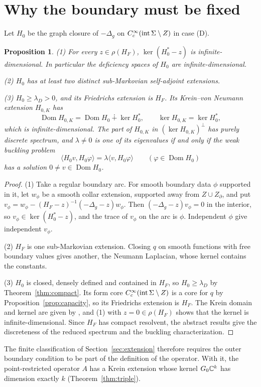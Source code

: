 \documentclass[11pt]{article}
\newtheorem{proposition}[theorem]{Proposition}
\theoremstyle{definition}\newtheorem{definition}[theorem]{Definition}
\theoremstyle{remark}\newtheorem{remark}[theorem]{Remark}
\newcommand{\Dom}{\operatorname{Dom}}\newcommand{\dd}{\,d}
\begin{document}
\section{Why the boundary must be fixed}\label{sec:boundary}
Let $H_0$ be the graph closure of $-\Delta_g$ on $C_c^\infty(\operatorname{int}\Sigma\setminus Z)$
in case (D).
\begin{proposition}\label{prop:outer}
(1) For every $z\in\rho(H_F)$, $\ker(H_0^*-z)$ is infinite-dimensional. In
particular the deficiency spaces of $H_0$ are infinite-dimensional.

(2) $H_0$ has at least two distinct sub-Markovian self-adjoint extensions.

(3) $H_0\geq\lambda_D>0$, and its Friedrichs extension is $H_F$. Its
Krein--von Neumann extension $H_{0,K}$ has
\[
 \Dom H_{0,K}=\Dom H_0\dotplus\ker H_0^*,\qquad \ker H_{0,K}=\ker H_0^*,
\]
which is infinite-dimensional. The part of $H_{0,K}$ in $(\ker H_{0,K})^\perp$ has
purely discrete spectrum, and $\lambda\neq0$ is one of its eigenvalues if and only
if the weak buckling problem
\[
 \langle H_0v,H_0\varphi\rangle=\lambda\langle v,H_0\varphi\rangle\qquad(\varphi\in\Dom H_0)
\]
has a solution $0\neq v\in\Dom H_0$.
\end{proposition}
\begin{proof}
(1) Take a regular boundary arc. For smooth boundary data $\phi$ supported in
it, let $w_\phi$ be a smooth collar extension, supported away from $Z\cup Z_\partial$,
and put $v_\phi=w_\phi-(H_F-z)^{-1}(-\Delta_g-z)w_\phi$. Then
$(-\Delta_g-z)v_\phi=0$ in the interior, so $v_\phi\in\ker(H_0^*-z)$, and the trace
of $v_\phi$ on the arc is $\phi$. Independent $\phi$ give independent $v_\phi$.

(2) $H_F$ is one sub-Markovian extension. Closing $q$ on smooth functions with
free boundary values gives another, the Neumann Laplacian, whose kernel
contains the constants.

(3) $H_0$ is closed, densely defined and contained in $H_F$, so
$H_0\geq\lambda_D$ by Theorem~\ref{thm:compact}. Its form core
$C_c^\infty(\operatorname{int}\Sigma\setminus Z)$ is a core for $q$ by
Proposition~\ref{prop:capacity}, so its Friedrichs extension is $H_F$. The
Krein domain and kernel are given by \cite[Thm.~2.1]{krein}, and (1) with
$z=0\in\rho(H_F)$ shows that the kernel is infinite-dimensional. Since $H_F$ has
compact resolvent, the abstract results \cite[Hyp.~2.2, Thms.~2.4 and
3.4]{krein} give the discreteness of the reduced spectrum and the buckling
characterization.
\end{proof}
The finite classification of Section~\ref{sec:extension} therefore requires
the outer boundary condition to be part of the definition of the operator.
With it, the point-restricted operator $A$ has a Krein extension whose kernel
$G_0\mathbb C^k$ has dimension exactly $k$ (Theorem~\ref{thm:triple}).
\end{document}
